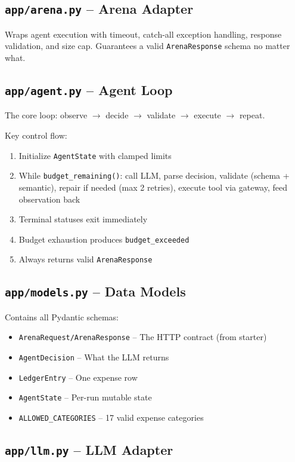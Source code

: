 \documentclass[12pt,a4paper]{article}
\begin{document}
\subsection{\texttt{app/arena.py} -- Arena Adapter}

Wraps agent execution with timeout, catch-all exception handling, response validation, and size cap. Guarantees a valid \texttt{ArenaResponse} schema no matter what.

\subsection{\texttt{app/agent.py} -- Agent Loop}

The core loop: observe $\rightarrow$ decide $\rightarrow$ validate $\rightarrow$ execute $\rightarrow$ repeat.

Key control flow:
\begin{enumerate}
  \item Initialize \texttt{AgentState} with clamped limits
  \item While \texttt{budget\_remaining()}: call LLM, parse decision, validate (schema + semantic), repair if needed (max 2 retries), execute tool via gateway, feed observation back
  \item Terminal statuses exit immediately
  \item Budget exhaustion produces \texttt{budget\_exceeded}
  \item Always returns valid \texttt{ArenaResponse}
\end{enumerate}

\subsection{\texttt{app/models.py} -- Data Models}

Contains all Pydantic schemas:
\begin{itemize}
  \item \texttt{ArenaRequest/ArenaResponse} -- The HTTP contract (from starter)
  \item \texttt{AgentDecision} -- What the LLM returns
  \item \texttt{LedgerEntry} -- One expense row
  \item \texttt{AgentState} -- Per-run mutable state
  \item \texttt{ALLOWED\_CATEGORIES} -- 17 valid expense categories
\end{itemize}

\subsection{\texttt{app/llm.py} -- LLM Adapter}
\end{document}
